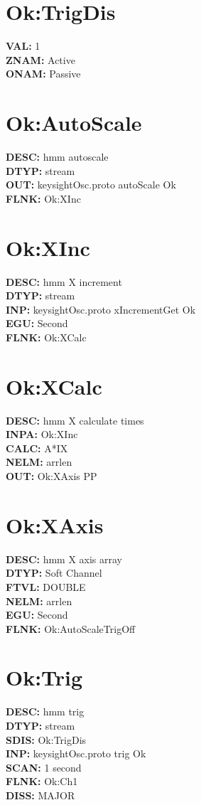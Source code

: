\documentclass[12pt]{article}
\begin{document}
\section{Ok:TrigDis}
\textbf{VAL: }1 \\
\textbf{ZNAM: }Active \\
\textbf{ONAM: }Passive \\
\newpage
\section{Ok:AutoScale}
\textbf{DESC: }hmm autoscale \\
\textbf{DTYP: }stream \\
\textbf{OUT: }keysightOsc.proto autoScale Ok \\
\textbf{FLNK: }Ok:XInc \\
\newpage
\section{Ok:XInc}
\textbf{DESC: }hmm X increment \\
\textbf{DTYP: }stream \\
\textbf{INP: }keysightOsc.proto xIncrementGet Ok \\
\textbf{EGU: }Second \\
\textbf{FLNK: }Ok:XCalc \\
\newpage
\section{Ok:XCalc}
\textbf{DESC: }hmm X calculate times \\
\textbf{INPA: }Ok:XInc \\
\textbf{CALC: }A*IX \\
\textbf{NELM: }arrlen \\
\textbf{OUT: }Ok:XAxis PP \\
\newpage
\section{Ok:XAxis}
\textbf{DESC: }hmm X axis array \\
\textbf{DTYP: }Soft Channel \\
\textbf{FTVL: }DOUBLE \\
\textbf{NELM: }arrlen \\
\textbf{EGU: }Second \\
\textbf{FLNK: }Ok:AutoScaleTrigOff \\
\newpage
\section{Ok:Trig}
\textbf{DESC: }hmm trig \\
\textbf{DTYP: }stream \\
\textbf{SDIS: }Ok:TrigDis \\
\textbf{INP: }keysightOsc.proto trig Ok \\
\textbf{SCAN: }1 second \\
\textbf{FLNK: }Ok:Ch1 \\
\textbf{DISS: }MAJOR \\
\newpage
\end{document}
